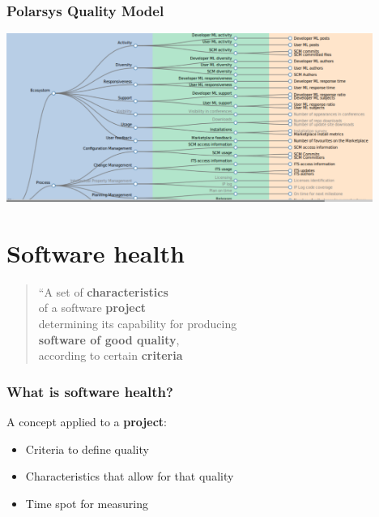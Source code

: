 \documentclass[17pt,aspectratio=169,hyperref=pdfusetitle]{beamer}
\begin{document}
\begin{frame}[fragile]
  \frametitle{Polarsys Quality Model}

  \begin{center}
  \includegraphics[height=5.5cm]{figs/polarsys-all}
  \end{center}  
  
\end{frame}

\section{Software health}

\begin{frame}[fragile]

  
  {\em
    \begin{quote}
      ``A set of \textbf{characteristics} \\
      of a software \textbf{project} \\
      determining its capability for producing \\
      \textbf{software of good quality}, \\
      according to certain \textbf{criteria}
  \end{quote}
  }
  
\end{frame}


\begin{frame}[fragile]
  \frametitle{What is software health?}

  A concept applied to a \textbf{project}:
  
  \begin{itemize}
  \item Criteria to define quality
  \item Characteristics that allow for that quality
  \item Time spot for measuring
  \end{itemize}
\end{frame}
\end{document}
